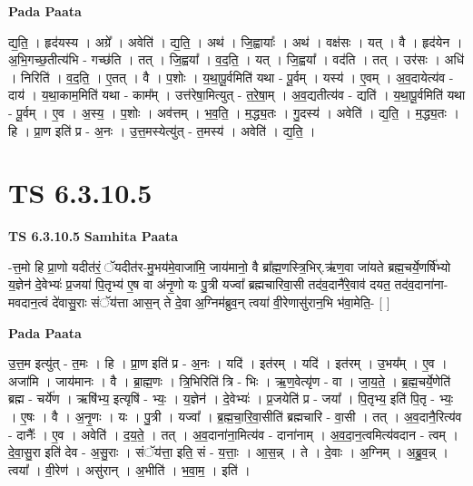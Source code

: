 \documentclass[17pt]{extarticle}
\begin{document}
\textbf{Pada Paata} \newline

द्य॒ति॒ । हृद॑यस्य । अग्रे᳚ । अवेति॑ । द्य॒ति॒ । अथ॑ । जि॒ह्वायाः᳚ । अथ॑ । वक्ष॑सः । यत् । वै । हृद॑येन । अ॒भि॒गच्छ॒तीत्य॑भि - गच्छ॑ति । तत् । जि॒ह्वया᳚ । व॒द॒ति॒ । यत् । जि॒ह्वया᳚ । वद॑ति । तत् । उर॑सः । अधि॑ । निरिति॑ । व॒द॒ति॒ । ए॒तत् । वै । प॒शोः । य॒था॒पू॒र्वमिति॑ यथा - पू॒र्वम् । यस्य॑ । ए॒वम् । अ॒व॒दायेत्य॑व - दाय॑ । य॒था॒काम॒मिति॑ यथा - काम᳚म् । उत्त॑रेषा॒मित्युत् - त॒रे॒षा॒म् । अ॒व॒द्यतीत्य॑व - द्यति॑ । य॒था॒पू॒र्वमिति॑ यथा - पू॒र्वम् । ए॒व । अ॒स्य॒ । प॒शोः । अव॑त्तम् । भ॒व॒ति॒ । म॒द्ध्य॒तः । गु॒दस्य॑ । अवेति॑ । द्य॒ति॒ । म॒द्ध्य॒तः । हि । प्रा॒ण इति॑ प्र - अ॒नः । उ॒त्त॒मस्येत्यु॑त् - त॒मस्य॑ । अवेति॑ । द्य॒ति॒ ।  \newline




\section*{ TS 6.3.10.5 }

\textbf{TS 6.3.10.5 } \newline
\textbf{Samhita Paata} \newline

-त्त॒मो हि प्रा॒णो यदीत॑रं॒ ॅयदीत॑र-मु॒भय॑मे॒वाजा॑मि॒ जाय॑मानो॒ वै ब्रा᳚ह्म॒णस्त्रि॒भिर्.ऋ॑ण॒वा जा॑यते ब्रह्म॒चर्ये॒णर्षि॑भ्यो य॒ज्ञेन॑ दे॒वेभ्यः॑ प्र॒जया॑ पि॒तृभ्य॑ ए॒ष वा अ॑नृ॒णो यः पु॒त्री यज्वा᳚ ब्रह्मचारिवा॒सी तद॑व॒दानै॑रे॒वाव॑ दयत॒ तद॑व॒दाना॑ना-मवदान॒त्वं दे॑वासु॒राः संॅय॑त्ता आस॒न् ते दे॒वा अ॒ग्निम॑ब्रुव॒न् त्वया॑ वी॒रेणासु॑रान॒भि भ॑वा॒मेति॒- [  ] \newline

\textbf{Pada Paata} \newline

उ॒त्त॒म इत्यु॑त् - त॒मः । हि । प्रा॒ण इति॑ प्र - अ॒नः । यदि॑ । इत॑रम् । यदि॑ । इत॑रम् । उ॒भय᳚म् । ए॒व । अजा॑मि । जाय॑मानः । वै । ब्रा॒ह्म॒णः । त्रि॒भिरिति॑ त्रि - भिः । ऋ॒ण॒वेत्यृ॑ण - वा । जा॒य॒ते॒ । ब्र॒ह्म॒चर्ये॒णेति॑ ब्रह्म - चर्ये॑ण । ऋषि॑भ्य॒ इत्यृषि॑ - भ्यः॒ । य॒ज्ञेन॑ । दे॒वेभ्यः॑ । प्र॒जयेति॑ प्र - जया᳚ । पि॒तृभ्य॒ इति॑ पि॒तृ - भ्यः॒ । ए॒षः । वै । अ॒नृ॒णः । यः । पु॒त्री । यज्वा᳚ । ब्र॒ह्म॒चा॒रि॒वा॒सीति॑ ब्रह्मचारि - वा॒सी । तत् । अ॒व॒दानै॒रित्य॑व - दानैः᳚ । ए॒व । अवेति॑ । द॒य॒ते॒ । तत् । अ॒व॒दाना॑ना॒मित्य॑व - दाना॑नाम् । अ॒व॒दा॒न॒त्वमित्य॑वदान - त्वम् । दे॒वा॒सु॒रा इति॑ देव - अ॒सु॒राः । संॅय॑त्ता॒ इति॒ सं - य॒त्ताः॒ । आ॒स॒न्न् । ते । दे॒वाः । अ॒ग्निम् । अ॒ब्रु॒व॒न्न् । त्वया᳚ । वी॒रेण॑ । असु॑रान् । अ॒भीति॑ । भ॒वा॒म॒ । इति॑ ।  \newline
\end{document}
